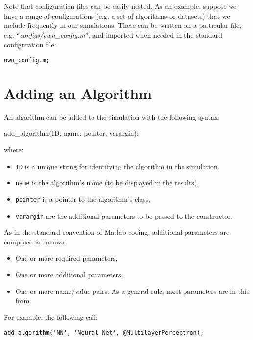 \noindent Note that configuration files can be easily nested. As an example, suppose we have a range of configurations (e.g. a set of algorithms or datasets) that we include frequently in our simulations. These can be written on a particular file, e.g. ``\textit{configs/own\_config.m}'', and imported when needed in the standard configuration file:

\begin{lstlisting}
own_config.m;
\end{lstlisting}


\section{Adding an Algorithm}

An algorithm can be added to the simulation with the following syntax:

\begin{console}
add_algorithm(ID, name, pointer, varargin);
\end{console}

\noindent where:

\begin{itemize}
	\item \verb|ID| is a unique string for identifying the algorithm in the simulation,
	\item \verb|name| is the algorithm’s name (to be displayed in the results),
	\item \verb|pointer| is a pointer to the algorithm’s class,
	\item \verb|varargin| are the additional parameters to be passed to the constructor.
\end{itemize}

\noindent As in the standard convention of Matlab coding, additional parameters are composed as follows:

\begin{itemize}
	\item One or more required parameters,
	\item One or more additional parameters,
	\item One or more name/value pairs. As a general rule, most parameters are in this form.
\end{itemize}

\noindent For example, the following call:

\begin{lstlisting}
add_algorithm('NN', 'Neural Net', @MultilayerPerceptron);
\end{lstlisting}

